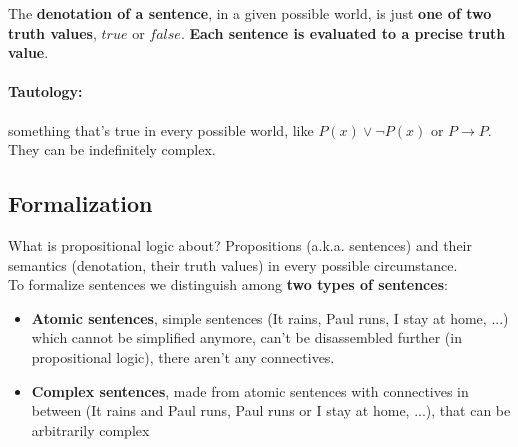 \documentclass[11pt]{article}
\begin{document}
	The \textbf{denotation of a sentence}, in a given possible world, is just \textbf{one of two truth values}, $true$ or $false$. \textbf{Each sentence is evaluated to a precise truth value}.\\
	
	\paragraph{Tautology:} something that's true in every possible world, like $P(x) \vee \neg P(x)$ or $P \rightarrow P$. They can be indefinitely complex.\\
	
	\newpage
	
	\subsection{Formalization}
	What is propositional logic about? Propositions (a.k.a. sentences) and their semantics (denotation, their truth values) in every possible circumstance.\\
	
	To formalize sentences we distinguish among \textbf{two types of sentences}: 
	\begin{itemize}
		\item \textbf{Atomic sentences},  simple sentences (It rains, Paul runs, I stay at home, ...) which cannot be simplified anymore, can't be disassembled further (in propositional logic), there aren't any connectives.\\
		
		\item \textbf{Complex sentences}, made from atomic sentences with connectives in between (It rains and Paul runs, Paul runs or I stay at home, ...), that can be arbitrarily complex
	\end{itemize}
	
\end{document}
